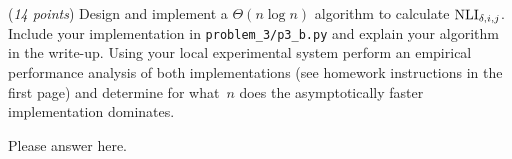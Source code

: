 \documentclass{hw}
\begin{document}
\begin{problem}
  \begin{subproblem}
    (\textit{14 points})
    Design and implement a $\Theta(n\log n)$ algorithm to calculate
    $\textrm{NLI}_{\delta,i,j}$. Include your implementation in
    \texttt{problem\_3/p3\_b.py} and explain your algorithm in the write-up.
    Using your local experimental system perform
    an empirical performance analysis of both implementations (see homework
    instructions in the first page) and determine
    for what~$n$ does the asymptotically faster implementation dominates.
  \end{subproblem}

\begin{solution}
Please answer here.
\end{solution}

\end{problem}

\newpage
\end{document}
